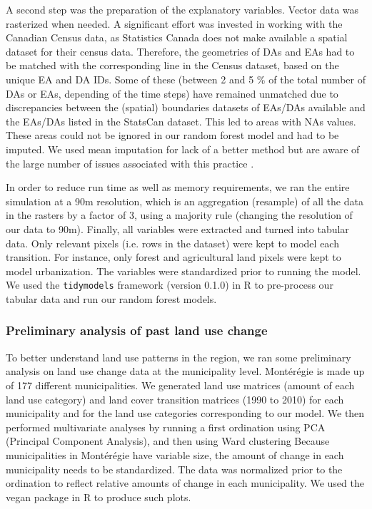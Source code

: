 A second step was the preparation of the explanatory variables. Vector data was rasterized when needed. A significant effort was invested in working with the Canadian Census data, as Statistics Canada does not make available a spatial dataset for their census data. Therefore, the geometries of DAs and EAs had to be matched with the corresponding line in the Census dataset, based on the unique EA and DA IDs. Some of these (between 2 and 5 \% of the total number of DAs or EAs, depending of the time steps) have remained unmatched due to discrepancies between the (spatial) boundaries datasets of EAs/DAs available and the EAs/DAs listed in the StatsCan dataset. This led to areas with NAs values. These areas could not be ignored in our random forest model and had to be imputed. We used mean imputation for lack of a better method but are aware of the large number of issues associated with this practice \citep[see][]{lodder_impute_2014}.

In order to reduce run time as well as memory requirements, we ran the entire simulation at a 90m resolution, which is an aggregation (resample) of all the data in the rasters by a factor of 3, using a majority rule (changing the resolution of our data to 90m). Finally, all variables were extracted and turned into tabular data. Only relevant pixels (i.e. rows in the dataset) were kept to model each transition. For instance, only forest and agricultural land pixels were kept to model urbanization. The variables were standardized prior to running the model. We used the \verb|tidymodels| framework (version 0.1.0) in R to pre-process our tabular data and run our random forest models. \\

\subsubsection{Preliminary analysis of past land use change}

To better understand land use patterns in the region, we ran some preliminary analysis on land use change data at the municipality level. Montérégie is made up of 177 different municipalities. We generated land use matrices (amount of each land use category) and land cover transition matrices (1990 to 2010) for each municipality and for the land use categories corresponding to our model. We then performed multivariate analyses by running a first ordination using PCA (Principal Component Analysis), and then using Ward clustering %
Because municipalities in Montérégie have variable size, the amount of change in each municipality needs to be standardized. The data was normalized prior to the ordination to reflect relative amounts of change in each municipality. We used the vegan package in R to produce such plots.\\

